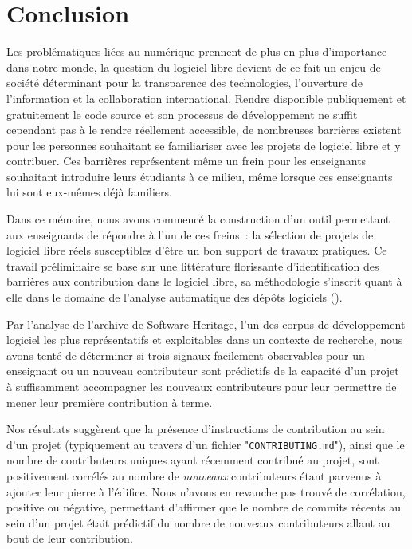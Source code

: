 \chapter*{Conclusion}

Les problématiques liées au numérique prennent de plus en plus d'importance dans notre monde, la question du
logiciel libre devient de ce fait un enjeu de société déterminant pour la transparence des technologies,
l'ouverture de l'information et la collaboration international. Rendre disponible publiquement et gratuitement
le code source et son processus de développement ne suffit cependant pas à le rendre réellement accessible, de
nombreuses barrières existent pour les personnes souhaitant se familiariser avec les projets de logiciel libre
et y contribuer. Ces barrières représentent même un frein pour les enseignants souhaitant introduire leurs
étudiants à ce milieu, même lorsque ces enseignants lui sont eux-mêmes déjà familiers.

Dans ce mémoire, nous avons commencé la construction d'un outil permettant aux enseignants de répondre à l'un
de ces freins : la sélection de projets de logiciel libre réels susceptibles d'être un bon support de travaux
pratiques. Ce travail préliminaire se base sur une littérature florissante d'identification des barrières aux
contribution dans le logiciel libre, sa méthodologie s'inscrit quant à elle dans le domaine de l'analyse
automatique des dépôts logiciels (\href{https://conf.researchr.org/series/msr}{}).

Par l'analyse de l'archive de Software Heritage, l'un des corpus de développement logiciel les plus
représentatifs et exploitables dans un contexte de recherche, nous avons tenté de déterminer si trois signaux
facilement observables pour un enseignant ou un nouveau contributeur sont prédictifs de la capacité d'un
projet à suffisamment accompagner les nouveaux contributeurs pour leur permettre de mener leur première
contribution à terme.

Nos résultats suggèrent que la présence d'instructions de contribution au sein d'un projet (typiquement au
travers d'un fichier "\texttt{CONTRIBUTING.md}"), ainsi que le nombre de contributeurs uniques ayant récemment
contribué au projet, sont positivement corrélés au nombre de \emph{nouveaux} contributeurs étant parvenus à
ajouter leur pierre à l'édifice. Nous n'avons en revanche pas trouvé de corrélation, positive ou négative,
permettant d'affirmer que le nombre de \glspl{commit} récents au sein d'un projet était prédictif du nombre de
nouveaux contributeurs allant au bout de leur contribution.

